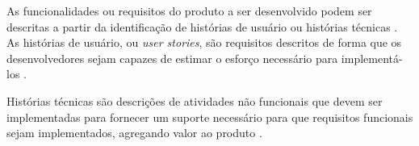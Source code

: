 As funcionalidades ou requisitos do produto a ser desenvolvido podem ser descritas a partir da identificação de histórias de usuário ou histórias técnicas \cite{galen_technical_2013}. As histórias de usuário, ou \textit{user stories}, são requisitos descritos de forma que os desenvolvedores sejam capazes de estimar o esforço necessário para implementá-los \cite{ambler_user_2005}.

Histórias técnicas são descrições de atividades não funcionais que devem ser implementadas para fornecer um suporte necessário para que requisitos funcionais sejam implementados, agregando valor ao produto \cite{galen_technical_2013}.

